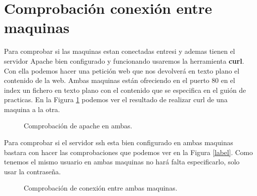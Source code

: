 \documentclass[12pt,a4paper]{article}
\begin{document}
\section{Comprobación conexión entre maquinas}
Para comprobar si las maquinas estan conectadas entresi y ademas tienen el servidor Apache bien configurado y funcionando usaremos la herramienta \textbf{curl}. Con ella podemos hacer una petición web que nos devolverá en texto plano el contenido de la web. Ambas maquinas están ofreciendo en el puerto 80 en el index un fichero en texto plano con el contenido que se especifica en el guión de practicas. En la Figura \ref{f:maquinas} podemos ver el resultado de realizar curl de una maquina a la otra. 
\begin{figure}[H]
	\centering
	\caption{Comprobación de apache en ambas.}
	
	\label{f:maquinas}
\end{figure}

Para comprobar si el servidor ssh esta bien configurado en ambas maquinas bastara con hacer las comprobaciones que podemos ver en la Figura \ref{label}. Como tenemos el mismo usuario en ambas maquinas no hará falta especificarlo, solo usar la contraseña. 
\begin{figure}[H]
	\centering
	\caption{Comprobación de conexión entre ambas maquinas.}
	
	\label{f:ssh}
\end{figure}
\end{document}
